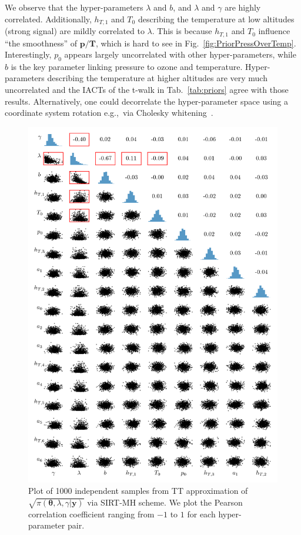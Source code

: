 We observe that the hyper-parameters $\lambda$ and $b$, and $\lambda$ and $\gamma$ are highly correlated.
Additionally, $h_{T,1}$ and $T_0$ describing the temperature at low altitudes (strong signal) are mildly correlated to $\lambda$.
This is because $h_{T,1}$ and $T_0$ influence ``the smoothness'' of $\bm{p}/\bm{T}$, which is hard to see in Fig.~\ref{fig:PriorPressOverTemp}.
Interestingly, $p_0$ appears largely uncorrelated with other hyper-parameters, while $b$ is the key parameter linking pressure to ozone and temperature.
Hyper-parameters describing the temperature at higher altitudes are very much uncorrelated and the IACTs of the t-walk in Tab.~\ref{tab:priors} agree with those results.
Alternatively, one could decorrelate the hyper-parameter space using a coordinate system rotation e.g.,~via Cholesky whitening~\cite{KessyWhitening2018}.
\clearpage
\begin{figure}[h!]%
	\includegraphics[]{CorrPlot.png}
	\caption[Correlation plot of samples from TT approximation]{Plot of 1000 independent samples from TT approximation of $\sqrt{\pi( \bm{\theta},\lambda,\gamma  | \bm{y})}$ via SIRT-MH scheme. We plot the Pearson correlation coefficient ranging from $-1$ to $1$ for each hyper-parameter pair.}
	\label{fig:CorrPlot}
\end{figure}
